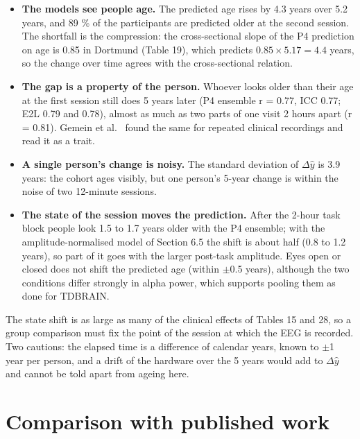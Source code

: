 \documentclass[11pt,a4paper]{article}
\begin{document}
\begin{itemize}
\item \textbf{The models see people age.} The predicted age rises by 4.3 years over 5.2 years, and 89 \% of the participants are predicted older at the second session. The shortfall is the compression: the cross-sectional slope of the P4 prediction on age is 0.85 in Dortmund (Table 19), which predicts $0.85 \times 5.17 = 4.4$ years, so the change over time agrees with the cross-sectional relation.
\item \textbf{The gap is a property of the person.} Whoever looks older than their age at the first session still does 5 years later (P4 ensemble r = 0.77, ICC 0.77; E2L 0.79 and 0.78), almost as much as two parts of one visit 2 hours apart (r = 0.81). Gemein et al.~\citep{gemein2024revisited} found the same for repeated clinical recordings and read it as a trait.
\item \textbf{A single person's change is noisy.} The standard deviation of $\Delta \hat y$ is 3.9 years: the cohort ages visibly, but one person's 5-year change is within the noise of two 12-minute sessions.
\item \textbf{The state of the session moves the prediction.} After the 2-hour task block people look 1.5 to 1.7 years older with the P4 ensemble; with the amplitude-normalised model of Section 6.5 the shift is about half (0.8 to 1.2 years), so part of it goes with the larger post-task amplitude. Eyes open or closed does not shift the predicted age (within $\pm$0.5 years), although the two conditions differ strongly in alpha power, which supports pooling them as done for TDBRAIN.
\end{itemize}

The state shift is as large as many of the clinical effects of Tables 15 and 28, so a group comparison must fix the point of the session at which the EEG is recorded. Two cautions: the elapsed time is a difference of calendar years, known to $\pm$1 year per person, and a drift of the hardware over the 5 years would add to $\Delta \hat y$ and cannot be told apart from ageing here.

\section{Comparison with published work}
\end{document}
